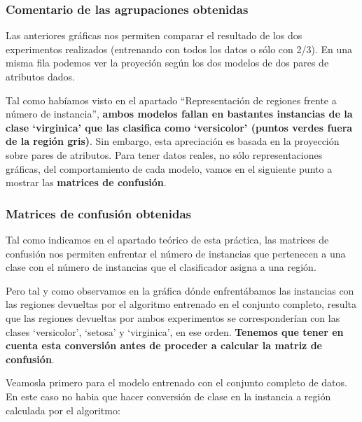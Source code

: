 \documentclass[11pt]{article}
\begin{document}
    \subsubsection{Comentario de las agrupaciones
obtenidas}\label{comentario-de-las-agrupaciones-obtenidas}

Las anteriores gráficas nos permiten comparar el resultado de los dos
experimentos realizados (entrenando con todos los datos o sólo con 2/3).
En una misma fila podemos ver la proyeción según los dos modelos de dos
pares de atributos dados.

Tal como habíamos visto en el apartado ``Representación de regiones
frente a número de instancia'', \textbf{ambos modelos fallan en
bastantes instancias de la clase `virginica' que las clasifica como
`versicolor' (puntos verdes fuera de la región gris)}. Sin embargo, esta
apreciación es basada en la proyección sobre pares de atributos. Para
tener datos reales, no sólo representaciones gráficas, del
comportamiento de cada modelo, vamos en el siguiente punto a mostrar las
\textbf{matrices de confusión}.

\subsubsection{Matrices de confusión
obtenidas}\label{matrices-de-confusiuxf3n-obtenidas}

Tal como indicamos en el apartado teórico de esta práctica, las matrices
de confusión nos permiten enfrentar el número de instancias que
pertenecen a una clase con el número de instancias que el clasificador
asigna a una región.

Pero tal y como observamos en la gráfica dónde enfrentábamos las
instancias con las regiones devueltas por el algoritmo entrenado en el
conjunto completo, resulta que las regiones devueltas por ambos
experimentos se corresponderían con las clases `versicolor', `setosa' y
`virginica', en ese orden. \textbf{Tenemos que tener en cuenta esta
conversión antes de proceder a calcular la matriz de confusión}.

Veamosla primero para el modelo entrenado con el conjunto completo de
datos. En este caso no habia que hacer conversión de clase en la
instancia a región calculada por el algoritmo:
\end{document}
